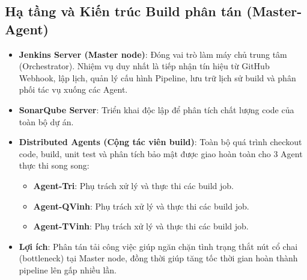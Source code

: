 \subsection{Hạ tầng và Kiến trúc Build phân tán (Master-Agent)}
\begin{itemize}[noitemsep]
    \item \textbf{Jenkins Server (Master node)}: Đóng vai trò làm máy chủ trung tâm (Orchestrator). Nhiệm vụ duy nhất là tiếp nhận tín hiệu từ GitHub Webhook, lập lịch, quản lý cấu hình Pipeline, lưu trữ lịch sử build và phân phối tác vụ xuống các Agent.
    \item \textbf{SonarQube Server}: Triển khai độc lập để phân tích chất lượng code của toàn bộ dự án.
    \item \textbf{Distributed Agents (Cộng tác viên build)}: Toàn bộ quá trình checkout code, build, unit test và phân tích bảo mật được giao hoàn toàn cho 3 Agent thực thi song song:
    \begin{itemize}[noitemsep]
        \item \textbf{Agent-Tri}: Phụ trách xử lý và thực thi các build job.
        \item \textbf{Agent-QVinh}: Phụ trách xử lý và thực thi các build job.
        \item \textbf{Agent-TVinh}: Phụ trách xử lý và thực thi các build job.
    \end{itemize}
    \item \textbf{Lợi ích}: Phân tán tải công việc giúp ngăn chặn tình trạng thắt nút cổ chai (bottleneck) tại Master node, đồng thời giúp tăng tốc thời gian hoàn thành pipeline lên gấp nhiều lần.
\end{itemize}
